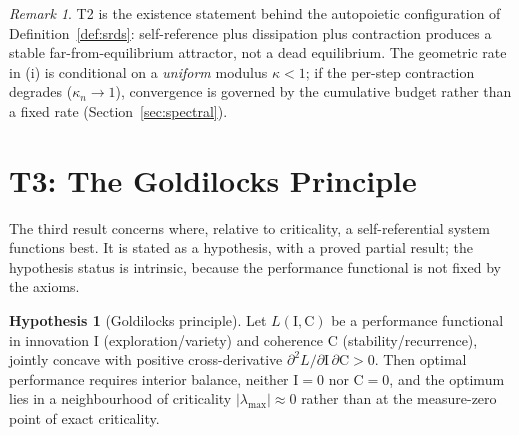 \documentclass[11pt]{article}
\theoremstyle{plain}
\theoremstyle{definition}
\newtheorem{hypothesis}[theorem]{Hypothesis}
\theoremstyle{remark}
\newtheorem{remark}[theorem]{Remark}
\newcommand{\abs}[1]{\left\lvert#1\right\rvert}
\begin{document}
\begin{remark}
T2 is the existence statement behind the autopoietic configuration of Definition~\ref{def:srds}: self-reference plus dissipation plus contraction produces a stable far-from-equilibrium attractor, not a dead equilibrium. The geometric rate in (i) is conditional on a \emph{uniform} modulus $\kappa<1$; if the per-step contraction degrades ($\kappa_n\to1$), convergence is governed by the cumulative budget rather than a fixed rate (Section~\ref{sec:spectral}).
\end{remark}

\section{T3: The Goldilocks Principle}\label{sec:t3}

The third result concerns where, relative to criticality, a self-referential system functions best. It is stated as a hypothesis, with a proved partial result; the hypothesis status is intrinsic, because the performance functional is not fixed by the axioms.

\begin{hypothesis}[Goldilocks principle]\label{hyp:goldi}
Let $L(\mathrm{I},\mathrm{C})$ be a performance functional in innovation $\mathrm{I}$ (exploration/variety) and coherence $\mathrm{C}$ (stability/recurrence), jointly concave with positive cross-derivative $\partial^2 L/\partial\mathrm{I}\,\partial\mathrm{C}>0$. Then optimal performance requires interior balance, neither $\mathrm{I}=0$ nor $\mathrm{C}=0$, and the optimum lies in a neighbourhood of criticality $\abs{\lambda_{\max}}\approx0$ rather than at the measure-zero point of exact criticality.
\end{hypothesis}
\end{document}
